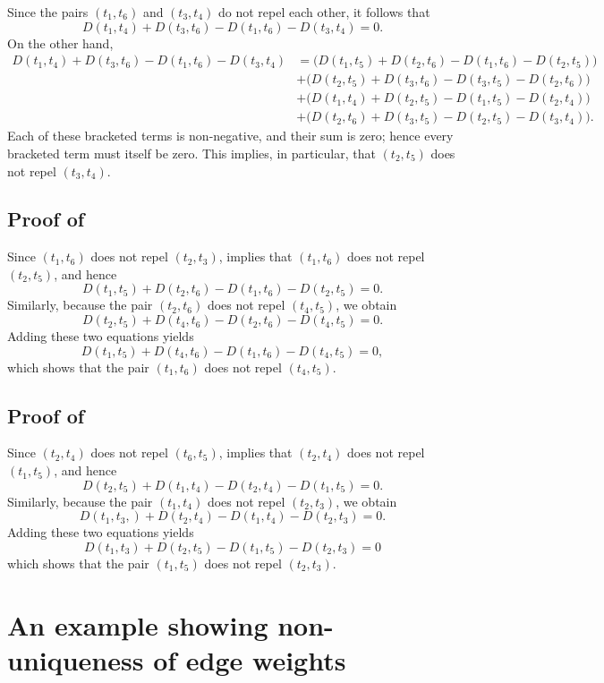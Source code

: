 \documentclass[11pt]{article}
\begin{document}
Since the pairs $(t_1,t_6)$ and $(t_3,t_4)$ do not repel each other, it follows that
\[D(t_1,t_4)+D(t_3,t_6)-D(t_1,t_6)-D(t_3,t_4)=0.\]
On the other hand,
\begin{align*}
    D(t_1,t_4)+D(t_3,t_6)-D(t_1,t_6)-D(t_3,t_4)
     & = \bigl(D(t_1,t_5)+D(t_2,t_6)-D(t_1,t_6)-D(t_2,t_5)\bigr) \\
    & + \bigl(D(t_2,t_5)+D(t_3,t_6)-D(t_3,t_5)-D(t_2,t_6)\bigr) \\
    & + \bigl(D(t_1,t_4)+D(t_2,t_5)-D(t_1,t_5)-D(t_2,t_4)\bigr) \\
    & + \bigl(D(t_2,t_6)+D(t_3,t_5)-D(t_2,t_5)-D(t_3,t_4)\bigr).
\end{align*}
Each of these bracketed terms is non-negative, and their sum is zero; hence every bracketed term must itself be zero. This implies, in particular, that $(t_2,t_5)$ does not repel $(t_3,t_4)$.

\subsection*{Proof of }

Since $(t_1,t_6)$ does not repel $(t_2,t_3)$,  implies that $(t_1,t_6)$ does not repel $(t_2,t_5)$, and hence
    \[
    D(t_1,t_5)+D(t_2,t_6)-D(t_1,t_6)-D(t_2,t_5)=0.
    \]
    Similarly, because the pair $(t_2,t_6)$ does not repel $(t_4,t_5)$, we obtain
    \[
    D(t_2,t_5)+D(t_4,t_6)-D(t_2,t_6)-D(t_4,t_5)=0.
    \]
    Adding these two equations yields
    \[
    D(t_1,t_5)+D(t_4,t_6)-D(t_1,t_6)-D(t_4,t_5)=0,
    \]
    which shows that the pair $(t_1,t_6)$ does not repel $(t_4,t_5)$.

\subsection*{Proof of }

Since $(t_2,t_4)$ does not repel $(t_6,t_5)$,  implies that $(t_2,t_4)$ does not repel $(t_1,t_5)$, and hence
    \[
    D(t_2,t_5)+D(t_1,t_4)-D(t_2,t_4)-D(t_1,t_5)=0.
    \]
    Similarly, because the pair $(t_1,t_4)$ does not repel $(t_2,t_3)$, we obtain
    \[
    D(t_1,t_3,)+D(t_2,t_4)-D(t_1,t_4)-D(t_2,t_3)=0.
    \]
    Adding these two equations yields
    \[
    D(t_1,t_3)+D(t_2,t_5)-D(t_1,t_5)-D(t_2,t_3)=0
    \]
    which shows that the pair $(t_1,t_5)$ does not repel $(t_2,t_3)$.
\section{An example showing non-uniqueness of edge weights}
\label{apd: example}
\end{document}
